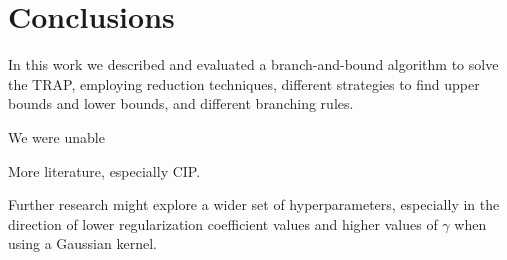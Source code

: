 \documentclass[runningheads]{llncs}
\begin{document}
\begin{table}
  \caption{Number of nodes generated by different configurations of the branch-and-bound algorithm over randomly generated TRAP instances with different numbers of rows and columns and different densities. Configurations whose runtime exceeded 5 minutes were assigned nan values.}
  \label{tab:results:nodes}
  \centering
\end{table}

\section{Conclusions}
\label{sec:conclusions}

In this work we described and evaluated a branch-and-bound algorithm to solve the TRAP, employing reduction techniques, different strategies to find upper bounds and lower bounds, and different branching rules. 

We were unable 

More literature, especially CIP.

Further research might explore a wider set of hyperparameters, especially in the direction of lower regularization coefficient values and higher values of $\gamma$ when using a Gaussian kernel.



\end{document}
